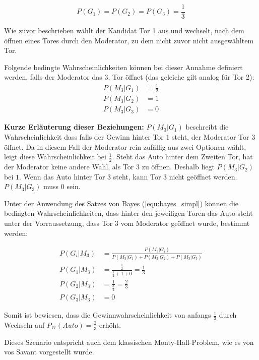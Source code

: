 \begin{equation*}
    P(G_1)=P(G_2)=P(G_3)=\frac{1}{3}
\end{equation*}

Wie zuvor beschrieben wählt der Kandidat Tor 1 aus und wechselt, nach dem öffnen eines Tores durch den Moderator, zu dem nicht zuvor nicht ausgewähltem Tor.

Folgende bedingte Wahrscheinlichkeiten können bei dieser Annahme definiert werden, falls der Moderator das 3. Tor öffnet (das geleiche gilt analog für Tor 2):
\begin{align*}
    P(M_3 | G_1) & = \frac{1}{2} \\
    P(M_3 | G_2) & = 1           \\
    P(M_3 | G_3) & = 0
\end{align*}

\textbf{Kurze Erläuterung dieser Beziehungen:} $P(M_3 | G_1)$ beschreibt die Wahrscheinlichkeit dass falls der Gewinn hinter Tor 1 steht, der Moderator Tor 3 öffnet. Da in diesem Fall der Moderator rein zufällig aus zwei Optionen wählt, leigt diese Wahrscheinlichkeit bei $\frac{1}{2}$. Steht das Auto hinter dem Zweiten Tor, hat der Moderator keine andere Wahl, als Tor 3 zu öffnen. Deshalb liegt $P(M_3 | G_2)$ bei $1$. Wenn das Auto hinter Tor 3 steht, kann Tor 3 nicht geöffnet werden. $P(M_3 | G_3)$ muss $0$ sein.

Unter der Anwendung des Satzes von Bayes (\autoref{equ:bayes_simpl}) können die bedingten Wahrscheinlichkeiten, dass hinter den jeweiligen Toren das Auto steht unter der Vorraussetzung, dass Tor 3 vom Moderator geöffnet wurde, bestimmt werden:

\begin{align*}
    P(G_i | M_3) & = \frac{P(M_3 | G_i)}{P(M_3 | G_1) +
    P(M_3 | G_2) + P(M_3 | G_3)}                                       \\
    P(G_1 | M_3) & = \frac{\frac{1}{2}}{\frac{1}{2}+1+0} = \frac{1}{3} \\
    P(G_2 | M_3) & = \frac{1}{\frac{3}{2}} = \frac{2}{3}               \\
    P(G_3 | M_3) & = 0
\end{align*}

Somit ist bewiesen, dass die Gewinnwahrscheinlichkeit von anfangs $\frac{1}{3}$ durch Wechseln auf $P_W(Auto) = \frac{2}{3}$ erhöht.

Dieses Szenario entspricht auch dem klassischen Monty-Hall-Problem, wie es von vos Savant vorgestellt wurde.


